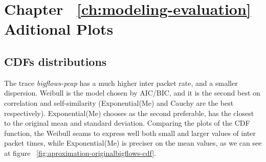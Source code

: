 \chapter{Chapter ~\ref{ch:modeling-evaluation} Aditional Plots}
\label{ap:aditional-plots}

\section{CDFs distributions}

The trace \textit{bigflows-pcap} has a much higher inter packet rate, and a smaller dispersion. Weibull is the model chosen by AIC/BIC, and it is the second best on correlation and self-similarity (Exponential(Me) and Cauchy are the best respectively). Exponential(Me) chooses as the second preferable, has the closest to the original mean and standard deviation. Comparing the plots of the CDF function, the Weibull seams to express well both small and larger values of inter packet times, while Exponential(Me) is preciser on the mean values, as we can see at figure ~\ref{fig:aproximation-originalbigflows-cdf}. 


